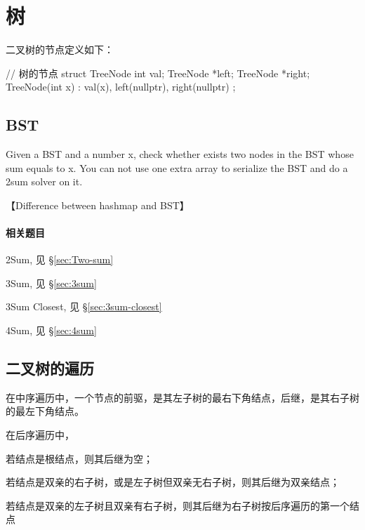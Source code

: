 \chapter{树}

二叉树的节点定义如下：
\begin{Code}
	// 树的节点
	struct TreeNode {
		int val;
		TreeNode *left;
		TreeNode *right;
		TreeNode(int x) : val(x), left(nullptr), right(nullptr) { }
	};
\end{Code}

\section{BST} %
\label{sec:binarySearchTree}

Given a BST and a number x, check whether exists two nodes in the BST whose sum equals to x. You can not use one extra array to serialize the BST and do a 2sum solver on it.

【Difference between hashmap and BST】

\subsubsection{相关题目}
\begindot
\item 2Sum, 见 \S \ref{sec:Two-sum}
\item 3Sum, 见 \S \ref{sec:3sum}
\item 3Sum Closest, 见 \S \ref{sec:3sum-closest}
\item 4Sum, 见 \S \ref{sec:4sum}
\myenddot

\section{二叉树的遍历} %
\label{sec:binaryTreeTraversal}

在中序遍历中，一个节点的前驱，是其左子树的最右下角结点，后继，是其右子树的最左下角结点。

在后序遍历中，
\begindot
\item 若结点是根结点，则其后继为空；
\item 若结点是双亲的右子树，或是左子树但双亲无右子树，则其后继为双亲结点；
\item 若结点是双亲的左子树且双亲有右子树，则其后继为右子树按后序遍历的第一个结点
\myenddot


